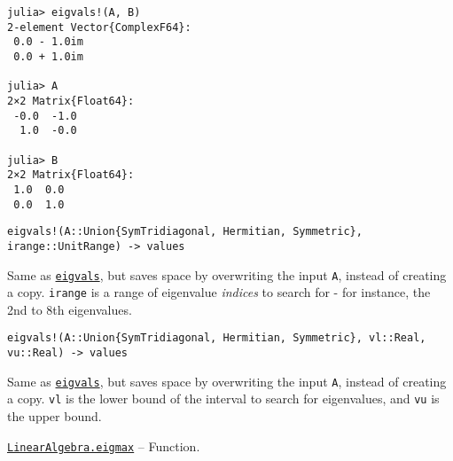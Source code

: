 \begin{adjustwidth}{2em}{0pt}
\begin{verbatim}
julia> eigvals!(A, B)
2-element Vector{ComplexF64}:
 0.0 - 1.0im
 0.0 + 1.0im

julia> A
2×2 Matrix{Float64}:
 -0.0  -1.0
  1.0  -0.0

julia> B
2×2 Matrix{Float64}:
 1.0  0.0
 0.0  1.0
\end{verbatim}




\begin{lstlisting}
eigvals!(A::Union{SymTridiagonal, Hermitian, Symmetric}, irange::UnitRange) -> values
\end{lstlisting}

Same as \hyperlink{12334018763942871611}{\texttt{eigvals}}, but saves space by overwriting the input \texttt{A}, instead of creating a copy. \texttt{irange} is a range of eigenvalue \emph{indices} to search for - for instance, the 2nd to 8th eigenvalues.




\begin{lstlisting}
eigvals!(A::Union{SymTridiagonal, Hermitian, Symmetric}, vl::Real, vu::Real) -> values
\end{lstlisting}

Same as \hyperlink{12334018763942871611}{\texttt{eigvals}}, but saves space by overwriting the input \texttt{A}, instead of creating a copy. \texttt{vl} is the lower bound of the interval to search for eigenvalues, and \texttt{vu} is the upper bound.



\end{adjustwidth}
\hypertarget{1568196261511691624}{}
\hyperlink{1568196261511691624}{\texttt{LinearAlgebra.eigmax}}  -- {Function.}


